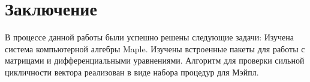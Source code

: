 \section{Заключение}

В процессе данной работы были успешно решены следующие задачи:
Изучена система компьютерной алгебры Maple.
Изучены встроенные пакеты для работы с матрицами и дифференциальными уравнениями.
Алгоритм для проверки сильной цикличности вектора реализован в виде набора процедур для Мэйпл.

